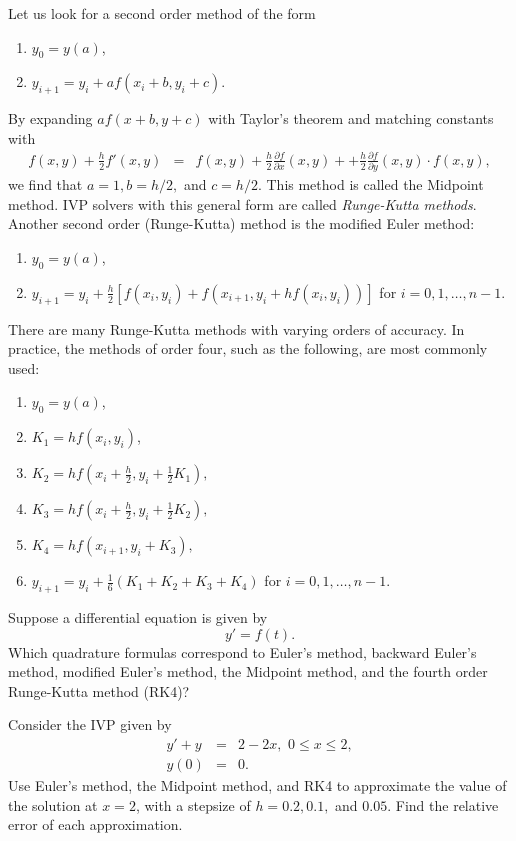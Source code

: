 Let us look for a second order method of the form 
\begin{enumerate}
\item $y_0 = y(a)$,
\item $y_{i+1} = y_i + a f(x_i+b, y_i+c)$.
\end{enumerate}
By expanding $a f(x+b, y+c)$ with Taylor's theorem and matching constants with 
\begin{eqnarray*}
f(x,y) + \frac{h}{2}f'(x,y) &=& f(x,y) + \frac{h}{2}\frac{\partial f}{\partial x}(x,y) +  + \frac{h}{2}\frac{\partial f}{\partial y}(x,y) \cdot f(x,y),
\end{eqnarray*}
we find that $a = 1, b = h/2,$ and $c = h/2$. This method is called the Midpoint method. IVP solvers with this general form are called \textit{Runge-Kutta methods}. Another second order (Runge-Kutta) method is the modified Euler method: 
\begin{enumerate}
\item $y_0 = y(a)$,
\item $y_{i+1} = y_i + \frac{h}{2}[ f(x_i, y_i) + f(x_{i+1}, y_i+ hf(x_i, y_i))]$ for $i = 0,1,\hdots, n-1$. 
\end{enumerate}

There are many Runge-Kutta methods with varying orders of accuracy. In practice, the methods of order four, such as the following, are most commonly used: 
\begin{enumerate}
\item $y_0 = y(a)$, 
\item $K_1 = hf(x_i,y_i)$,
\item $K_2 = hf(x_i + \frac{h}{2}, y_i + \frac{1}{2} K_1),$
\item $K_3 = hf(x_i + \frac{h}{2} , y_i + \frac{1}{2} K_2),$
\item $K_4 = hf(x_{i+1} , y_i +  K_3),$
\item $y_{i+1} = y_i + \frac{1}{6}(K_1 + K_2 + K_3 + K_4)$ for $i = 0,1,\hdots,n-1$.
\end{enumerate}




\begin{problem}
Suppose a differential equation is given by
\[ y' = f(t).\]
Which quadrature formulas correspond to Euler's method, backward Euler's method, modified Euler's method, the Midpoint method, and the fourth order Runge-Kutta method (RK4)? 
\end{problem}


\begin{problem}
Consider the IVP given by 
\begin{eqnarray*}
y' + y &=& 2-2x,\,\, 0 \leq x \leq 2, \\
y(0) &=& 0.
\end{eqnarray*}
Use Euler's method, the Midpoint method, and RK4 to approximate the value of the solution at $x = 2$, with a stepsize of $h = 0.2, 0.1,$ and $0.05 $. Find the relative error of each approximation.
\end{problem}

